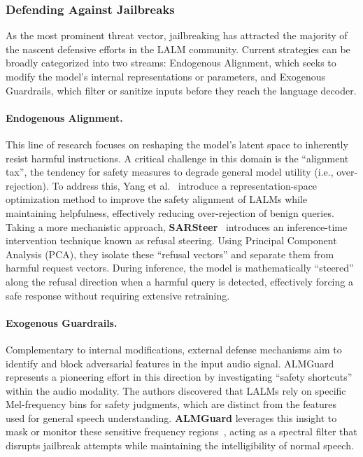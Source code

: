 \documentclass{llmxive}
\begin{document}
\subsubsection{Defending Against Jailbreaks}

As the most prominent threat vector, jailbreaking has attracted the majority of the nascent defensive efforts in the LALM community. Current strategies can be broadly categorized into two streams: Endogenous Alignment, which seeks to modify the model's internal representations or parameters, and Exogenous Guardrails, which filter or sanitize inputs before they reach the language decoder.

\paragraph{Endogenous Alignment.}
This line of research focuses on reshaping the model's latent space to inherently resist harmful instructions. A critical challenge in this domain is the ``alignment tax'', the tendency for safety measures to degrade general model utility (i.e., over-rejection). To address this, Yang et al.~\cite{yang2025reshaping} introduce a representation-space optimization method to improve the safety alignment of LALMs while maintaining helpfulness, effectively reducing over-rejection of benign queries.
Taking a more mechanistic approach, \textbf{SARSteer}~\cite{lin2025sarsteer} introduces an inference-time intervention technique known as refusal steering. Using Principal Component Analysis (PCA), they isolate these ``refusal vectors'' and separate them from harmful request vectors. During inference, the model is mathematically ``steered'' along the refusal direction when a harmful query is detected, effectively forcing a safe response without requiring extensive retraining.

\paragraph{Exogenous Guardrails.}
Complementary to internal modifications, external defense mechanisms aim to identify and block adversarial features in the input audio signal. ALMGuard~\cite{jin2025almguard} represents a pioneering effort in this direction by investigating ``safety shortcuts'' within the audio modality. The authors discovered that LALMs rely on specific Mel-frequency bins for safety judgments, which are distinct from the features used for general speech understanding. \textbf{ALMGuard} leverages this insight to mask or monitor these sensitive frequency regions~\cite{jin2025almguard}, acting as a spectral filter that disrupts jailbreak attempts while maintaining the intelligibility of normal speech.
\end{document}
